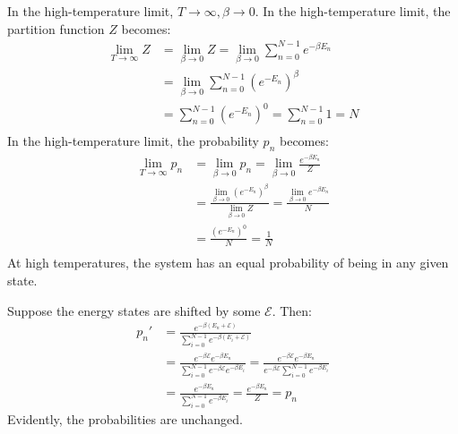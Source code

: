 \documentclass{article}
\begin{document}
\problem
In the high-temperature limit, $T \to \infty, \beta \to 0$. In the high-temperature limit, the partition function $Z$ becomes:
\begin{equation}
    \begin{split}
        \lim_{T\to\infty} Z & = \lim_{\beta\to 0} Z = \lim_{\beta\to 0} \sum_{n=0}^{N-1} e^{-\beta E_n} \\
        & = \lim_{\beta\to 0} \sum_{n=0}^{N-1} {\left(e^{- E_n}\right)}^{\beta} \\
        & = \sum_{n=0}^{N-1} {\left(e^{- E_n}\right)}^{0} = \sum_{n=0}^{N-1} 1 = N \\
    \end{split}
\end{equation}
In the high-temperature limit, the probability $p_n$ becomes:
\begin{equation}
    \begin{split}
        \lim_{T\to\infty} p_n & = \lim_{\beta\to 0} p_n = \lim_{\beta\to 0} \frac{ e^{-\beta E_n}}{Z} \\
        & = \frac{\lim_{\beta\to 0} {\left(e^{- E_n}\right)}^{\beta}}{\lim_{\beta\to 0} Z} = \frac{\lim_{\beta\to 0} e^{-\beta E_n}}{N} \\
        & = \frac{{\left(e^{- E_n}\right)}^{0}}{N} = \frac{1}{N} \\
    \end{split}
\end{equation}
At high temperatures, the system has an equal probability of being in any given state.

\clearpage

\problem
Suppose the energy states are shifted by some $\mathcal{E}$. Then:
\begin{equation}
    \begin{split}
        p_n' & = \frac{e^{-\beta (E_n + \mathcal{E})}}{\sum_{i=0}^{N-1} e^{-\beta (E_i + \mathcal{E})}} \\
        & = \frac{e^{-\beta\mathcal{E}}e^{-\beta E_n}}{\sum_{i=0}^{N-1} e^{-\beta\mathcal{E}}e^{-\beta E_i}} = \frac{e^{-\beta\mathcal{E}}e^{-\beta E_n}}{e^{-\beta\mathcal{E}}\sum_{i=0}^{N-1} e^{-\beta E_i}} \\
        & = \frac{e^{-\beta E_n}}{\sum_{i=0}^{N-1} e^{-\beta E_i}} = \frac{e^{-\beta E_n}}{Z} = p_n
    \end{split}
\end{equation}
Evidently, the probabilities are unchanged.

\clearpage

\problem
\end{document}
